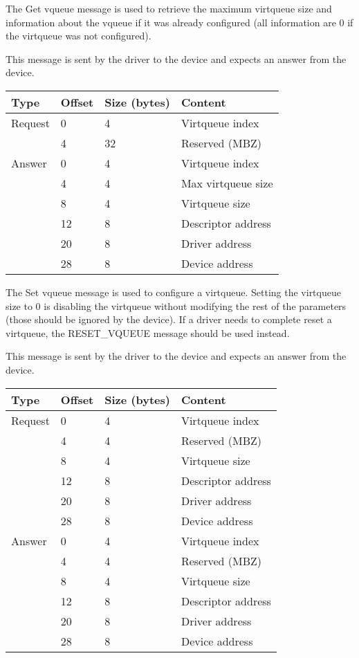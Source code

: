 
The Get vqueue message is used to retrieve the maximum virtqueue size and
information about the vqueue if it was already configured (all information are
0 if the virtqueue was not configured).

This message is sent by the driver to the device and expects an answer from the
device.

\begin{tabular}{|l|l|l|l|}
\hline
Type & Offset & Size (bytes) & Content \\
\hline \hline
Request & 0 & 4 & Virtqueue index \\
& 4 & 32 & Reserved (MBZ) \\
\hline
Answer & 0 & 4 & Virtqueue index \\
& 4 & 4 & Max virtqueue size \\
& 8 & 4 & Virtqueue size \\
& 12 & 8 & Descriptor address \\
& 20 & 8 & Driver address \\
& 28 & 8 & Device address \\
\hline
\end{tabular}


The Set vqueue message is used to configure a virtqueue.
Setting the virtqueue size to 0 is disabling the virtqueue without modifying
the rest of the parameters (those should be ignored by the device).
If a driver needs to complete reset a virtqueue, the RESET\_VQUEUE message
should be used instead.

This message is sent by the driver to the device and expects an answer from the
device.

\begin{tabular}{|l|l|l|l|}
\hline
Type & Offset & Size (bytes) & Content \\
\hline \hline
Request & 0 & 4 & Virtqueue index \\
& 4 & 4 & Reserved (MBZ) \\
& 8 & 4 & Virtqueue size \\
& 12 & 8 & Descriptor address \\
& 20 & 8 & Driver address \\
& 28 & 8 & Device address \\
\hline
Answer & 0 & 4 & Virtqueue index \\
& 4 & 4 & Reserved (MBZ) \\
& 8 & 4 & Virtqueue size \\
& 12 & 8 & Descriptor address \\
& 20 & 8 & Driver address \\
& 28 & 8 & Device address \\
\hline
\end{tabular}


